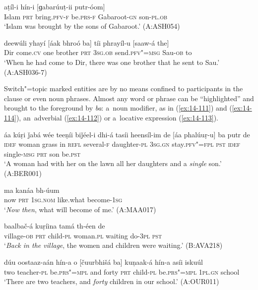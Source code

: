 \begin{exe}
\ex
\label{ex:14-109}
\gll [islaám ba] aṭíl-i hín-i [ɡabarúuṭ-ii putr-óom] \\
Islam \textsc{prt} bring.\textsc{pfv-f} be.\textsc{prs-f} Gabaroot-\textsc{gn} son-\textsc{pl.ob } \\
\glt `Islam was brought by the sons of Gabaroot.' (A:ASH054)

\ex
\label{ex:14-110}
\gll deewúli yhayí [áak bhroó ba] tíi phrayíl-u  [saaw-á the]  \\
Dir come.\textsc{cv} one brother \textsc{prt} \textsc{3sg.ob} send.\textsc{pfv"=msg}  Sau-\textsc{ob} to \\
\glt `When he had come to Dir, there was one brother that he sent to Sau.' (A:ASH036-7)
\end{exe}

Switch"=topic marked entities are by no means confined to participants in the clause or even noun phrases. Almost any word or phrase can be ``highlighted'' and brought to the foreground by \textit{ba}: a~noun modifier, as in (\ref{ex:14-111}) and (\ref{ex:14-114}), an~adverbial (\ref{ex:14-112}) or a~locative expression (\ref{ex:14-113}). 

\begin{exe}
\ex
\label{ex:14-111}
\gll áa kúṛi ǰabá wée teeṇíi biǰéel-i dhi-á  tasíi heensíl-im de
\textsc{[}áa phalúuṛ-u] ba  putr de \\
\textsc{idef} woman grass in \textsc{refl} several-\textsc{f } daughter-\textsc{pl}  \textsc{3sg.gn} stay.\textsc{pfv"=fpl} \textsc{pst} \textsc{idef} single-\textsc{msg} \textsc{prt} son be.\textsc{pst} \\
\glt `A woman had with her on the lawn all her daughters and a \textit{single} son.' (A:BER001)

\ex
\label{ex:14-112}
\gll [típa ba] ma kanáa bh-úum \\
now \textsc{prt} \textsc{1sg.nom} like.what become-\textsc{1sg } \\
\glt `\textit{Now then}, what will become of me.' (A:MAA017)

\ex
\label{ex:14-113}
\gll [díiš-a ba] baalbač-á kuṛíina tamá  th-éen de \\
village-\textsc{ob} \textsc{prt} child-\textsc{pl} woman.\textsc{pl} waiting do-\textsc{3pl} \textsc{pst } \\
\glt `\textit{Back in the village}, the women and children were waiting.' (B:AVA218)

\ex
\label{ex:14-114}
\gll dúu oostaaz-aán hín-a o [čuurbhišá  ba] kuṇaak-á hín-a asíi iskuúl \\
two teacher-\textsc{pl} be.\textsc{prs"=mpl} and forty  \textsc{prt} child-\textsc{pl} be.\textsc{prs"=mpl} \textsc{1pl.gn} school  \\
\glt `There are two teachers, and \textit{forty} children in our school.' (A:OUR011)
\end{exe}

